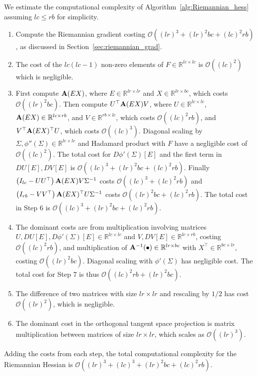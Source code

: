 \documentclass[pdflatex,sn-mathphys-num]{sn-jnl}
\newcounter{thm}[section]
\newcommand{\bfA}[1]{{\textbf A}(#1)}
\begin{document}
\noindent
We estimate the computational complexity of Algorithm~\ref{alg:Riemannian_hess} assuming $lc \leq rb$ for simplicity. 
%
\begin{enumerate}[label={Step \arabic*:}, leftmargin=*]
\item[Steps 1--4:] Compute the Riemannian gradient costing $\mathcal{O}((lr)^3 + (lr)^2bc + (lc)^2 rb)$, as discussed in Section~\ref{sec:riemannian_grad}.

\item[Step 5:] The cost of the $lc(lc-1)$ non-zero elements of $F\in \mathbb{R}^{lc \times lc}$ is $\mathcal{O}((lc)^2)$ which is negligible. 

\item[Step 6:] First compute ${\bf A}(EX)$, where $E \in \mathbb{R}^{lr \times lr}$ and $X \in \mathbb{R}^{lr \times bc}$, which costs $\mathcal{O}((lr)^2 bc)$. Then compute $U^{\top}{\bf A}(EX)V$, where $U \in \mathbb{R}^{lc \times lc}$, ${\bf A}(EX) \in \mathbb{R}^{lc \times rb}$, and $V \in \mathbb{R}^{rb \times lc}$, which costs $\mathcal{O}((lc)^2rb)$, and $V^{\top}{\bf A}(EX)^{\top} U$, which costs  $\mathcal{O}((lc)^3)$. Diagonal scaling by $\Sigma, \phi''(\Sigma)\in \mathbb{R}^{lc \times lc}$ and Hadamard product with $F$ have a negligible cost of $\mathcal{O}((lc)^2)$. The total cost for $D\phi'(\Sigma)[E]$ and the first term in $DU[E], DV[E]$ is $\mathcal{O}((lc)^3 + (lr)^2bc + (lc)^2rb)$. Finally $\left(I_{lc} - UU^{\top}\right)\bfA{EX} V \Sigma^{-1}$ costs $\mathcal{O}((lc)^3 + (lc)^2rb)$ and $\left(I_{rb} - VV^{\top}\right) \bfA{EX}^{\top} U\Sigma^{-1}$ costs $\mathcal{O}((lr)^2bc + (lc)^2rb)$. The total cost in Step 6 is $\mathcal{O}((lc)^3 + (lr)^2bc + (lc)^2rb)$. 

\item[Step 7:] The dominant costs are from multiplication involving matrices $U, DU[E], D\phi'(\Sigma)[E] \in \mathbb{R}^{lc \times lc}$ and $V, DV[E] \in \mathbb{R}^{lc \times rb}$, costing $\mathcal{O}((lc)^2rb)$, and multiplication of ${\bf A}^{-1}(\bullet) \in \mathbb{R}^{lr \times bc}$ with $X^{\top} \in \mathbb{R}^{bc \times lr}$, costing $\mathcal{O}((lr)^2bc)$. Diagonal scaling with $\phi'(\Sigma)$ has negligible cost. The total cost for Step 7 is thus $\mathcal{O}((lc)^2rb + (lr)^2bc)$.

\item[Step 8:] The difference of two matrices with size $lr \times lr$ and rescaling by $1/2$ has cost $\mathcal{O}((lr)^2)$, which is negligible. 

\item[Step 9:] The dominant cost in the orthogonal tangent space projection is matrix multiplication between matrices of size $lr \times lr$, which scales as $\mathcal{O}((lr)^3)$. 

\end{enumerate}
%
Adding the costs from each step, the total computational complexity for the Riemannian Hessian is $\mathcal{O}((lr)^3 + (lc)^3 + (lr)^2bc + (lc)^2 rb)$.
\end{document}

